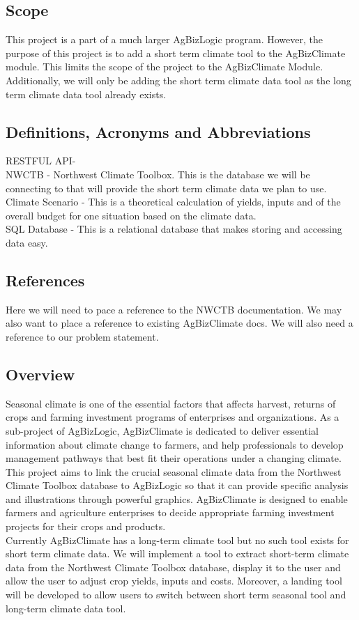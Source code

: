 \documentclass[onecolumn, draftclsnofoot,10pt, compsoc]{article}
\begin{document}
		\subsection{Scope}
			This project is a part of a much larger AgBizLogic program. However, the purpose of this project is to add a short term climate tool to the AgBizClimate module. This limits the scope of the project to the AgBizClimate Module. Additionally, we will only be adding the short term climate data tool as the long term climate data tool already exists.\\
		
		\subsection{Definitions, Acronyms and Abbreviations}
			RESTFUL API-\\
			NWCTB - Northwest Climate Toolbox. This is the database we will be connecting to that will provide the short term climate data we plan to use.\\
			Climate Scenario - This is a theoretical calculation of yields, inputs and of the overall budget for one situation based on the climate data.\\
			SQL Database - This is a relational database that makes storing and accessing data easy.\\
		
		\subsection{References}
			Here we will need to pace a reference to the NWCTB documentation. We may also want to place a reference to existing AgBizClimate docs.
			We will also need a reference to our problem statement.\\
		
		\subsection{Overview}
			Seasonal climate is one of the essential factors that affects harvest, returns of crops and farming investment programs of enterprises and organizations. As a sub-project of AgBizLogic, AgBizClimate is dedicated to deliver essential information about climate change to farmers, and help professionals to develop management pathways that best fit their operations under a changing climate. This project aims to link the crucial seasonal climate data from the Northwest Climate Toolbox database to AgBizLogic so that it can provide specific analysis and illustrations through powerful graphics. AgBizClimate is designed to enable farmers and agriculture enterprises to decide appropriate farming investment projects for their crops and products.\\
    Currently AgBizClimate has a long-term climate tool but no such tool exists for short term climate data. We will implement a tool to extract short-term climate data from the Northwest Climate Toolbox database, display it to the user and allow the user to adjust crop yields, inputs and costs. Moreover, a landing tool will be developed to allow users to switch between short term seasonal tool and long-term climate data tool.\\
\end{document}
